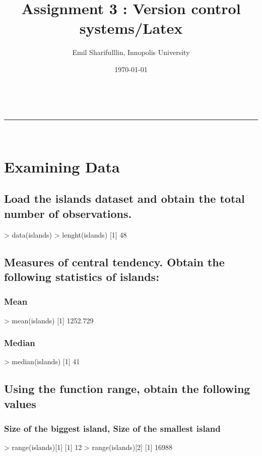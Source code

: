 \documentclass[a4paper,11pt]{article}
\makeatletter
\newcommand*{\TitleFont}{%
      \usefont{\encodingdefault}{\rmdefault}{b}{n}%
      \fontsize{16}{20}%
      \selectfont}
\renewcommand{\maketitle}{
\begin{center}
\vspace{2ex}
{\huge \textsc{\@title}}
\vspace{1ex}
\\
\rule{\linewidth}{0.5pt}\\
\@author \hfill \@date
\vspace{4ex}
\end{center}
}
\makeatother
\begin{document}
\title{ \TitleFont Assignment 3 : Version control systems/Latex }
\author{Emil Sharifulllin, Innopolis University}
\date{\today}
\maketitle
\tableofcontents
\section{Examining Data}
\subsection{Load the islands dataset and obtain the total number of observations.}
\begin{rcode}
> data(islands)
> lenght(islands)
[1] 48
\end{rcode}
\subsection{Measures of central tendency. Obtain the following statistics of islands:}
\subsubsection{Mean}
\begin{rcode}
> mean(islands)
[1] 1252.729
\end{rcode}
\subsubsection{Median}
\begin{rcode}
> median(islands)
[1] 41
\end{rcode}
\subsection{Using the function range, obtain the following values}
\subsubsection{Size of the biggest island, Size of the smallest island}
\begin{rcode}
> range(islands)[1]
[1] 12
> range(islands)[2]
[1] 16988
\end{rcode}
\end{document}
